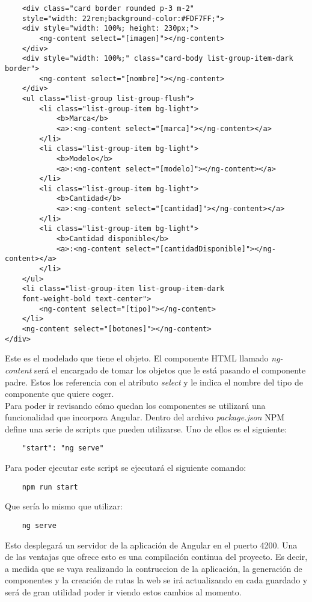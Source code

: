 \begin{verbatim}
    <div class="card border rounded p-3 m-2" 
    style="width: 22rem;background-color:#FDF7FF;">
    <div style="width: 100%; height: 230px;">
        <ng-content select="[imagen]"></ng-content>
    </div>
    <div style="width: 100%;" class="card-body list-group-item-dark border">
        <ng-content select="[nombre]"></ng-content>
    </div>
    <ul class="list-group list-group-flush">
        <li class="list-group-item bg-light">
            <b>Marca</b>
            <a>:<ng-content select="[marca]"></ng-content></a>
        </li>
        <li class="list-group-item bg-light">
            <b>Modelo</b>
            <a>:<ng-content select="[modelo]"></ng-content></a>
        </li>
        <li class="list-group-item bg-light">
            <b>Cantidad</b>
            <a>:<ng-content select="[cantidad]"></ng-content></a>
        </li>
        <li class="list-group-item bg-light">
            <b>Cantidad disponible</b>
            <a>:<ng-content select="[cantidadDisponible]"></ng-content></a>
        </li>
    </ul>
    <li class="list-group-item list-group-item-dark 
    font-weight-bold text-center">
        <ng-content select="[tipo]"></ng-content>
    </li>
    <ng-content select="[botones]"></ng-content>
</div>
\end{verbatim}
Este es el modelado que tiene el objeto. El componente HTML llamado \textit{ng-content} será el encargado de tomar los objetos que le está pasando el componente padre. Estos los referencia con el atributo \textit{select} y le indica el nombre del tipo de componente que quiere coger.
\\Para poder ir revisando cómo quedan los componentes se utilizará una funcionalidad que incorpora Angular. Dentro del archivo \textit{package.json} NPM define una serie de scripts que pueden utilizarse. Uno de ellos es el siguiente:
\begin{verbatim}
    "start": "ng serve"
\end{verbatim}
Para poder ejecutar este script se ejecutará el siguiente comando:
\begin{verbatim}
    npm run start
\end{verbatim}
Que sería lo mismo que utilizar:
\begin{verbatim}
    ng serve
\end{verbatim}
Esto desplegará un servidor de la aplicación de Angular en el puerto 4200. Una de las ventajas que ofrece esto es una compilación continua del proyecto. Es decir, a medida que se vaya realizando la contruccion de la aplicación, la generación de componentes y la creación de rutas la web se irá actualizando en cada guardado y será de gran utilidad poder ir viendo estos cambios al momento.